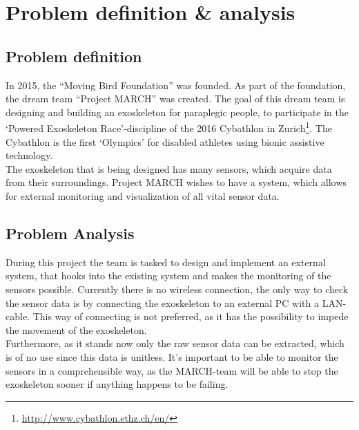 \section{Problem definition \& analysis}
\subsection{Problem definition}
In 2015, the ``Moving Bird Foundation'' was founded. As part of the foundation, the dream team ``Project MARCH'' was created. The goal of this dream team is designing and building an exoskeleton for paraplegic people, to participate in the `Powered Exoskeleton Race'-discipline of the 2016 Cybathlon in Zurich\footnote{\url{http://www.cybathlon.ethz.ch/en/}}. The Cybathlon is the first `Olympics' for disabled athletes using bionic assistive technology.\\ 
The exoskeleton that is being designed has many sensors, which acquire data from their surroundings. Project MARCH wishes to have a system, which allows for external monitoring and visualization of all vital sensor data.

\subsection{Problem Analysis}
During this project the team is tasked to design and implement an external system, that hooks into the existing system and makes the monitoring of the sensors possible. Currently there is no wireless connection, the only way to check the sensor data is by connecting the exoskeleton to an external PC with a LAN-cable. This way of connecting is not preferred, as it has the possibility to impede the movement of the exoskeleton.\\ Furthermore, as it stands now only the raw sensor data can be extracted, which is of no use since this data is unitless. It's important to be able to monitor the sensors in a comprehensible way, as the MARCH-team will be able to stop the exoskeleton sooner if anything happens to be failing.